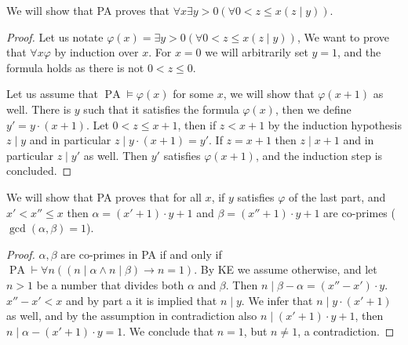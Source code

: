 \question{}
\subquestion{}
We will show that PA proves that $\forall x \exists y > 0 (\forall 0 < z \le x (z \mid y))$.
\begin{proof}
	Let us notate $\varphi(x) = \exists y > 0 (\forall 0 < z \le x (z \mid y))$, We want to prove that $\forall x \varphi$ by induction over $x$.
	For $x = 0$ we will arbitrarily set $y = 1$, and the formula holds as there is not $0 < z \le 0$.

	Let us assume that $\operatorname{PA} \models \varphi(x)$ for some $x$, we will show that $\varphi(x + 1)$ as well.
	There is $y$ such that it satisfies the formula $\varphi(x)$, then we define $y' = y \cdot (x + 1)$.
	Let $0 < z \le x + 1$, then if $z < x + 1$ by the induction hypothesis $z \mid y$ and in particular $z \mid y \cdot (x + 1) = y'$.
	If $z = x + 1$ then $z \mid x + 1$ and in particular $z \mid y'$ as well.
	Then $y'$ satisfies $\varphi(x + 1)$, and the induction step is concluded.
\end{proof}

\subquestion{}
We will show that PA proves that for all $x$, if $y$ satisfies $\varphi$ of the last part,
and $x' < x'' \le x$ then $\alpha = (x' + 1) \cdot y + 1$ and $\beta = (x'' + 1) \cdot y + 1$ are co-primes ($\gcd(\alpha, \beta) = 1$).
\begin{proof}
	$\alpha, \beta$ are co-primes in PA if and only if $\operatorname{PA} \vdash \forall n ((n \mid \alpha \land n \mid \beta) \rightarrow n = 1)$.
	By KE we assume otherwise, and let $n > 1$ be a number that divides both $\alpha$ and $\beta$.
	Then $n \mid \beta - \alpha = (x'' - x') \cdot y$.
	$x'' - x' < x$ and by part a it is implied that $n \mid y$.
	We infer that $n \mid y \cdot (x' + 1)$ as well, and by the assumption in contradiction also $n \mid (x' + 1) \cdot y + 1$, then $n \mid \alpha - (x' + 1) \cdot y = 1$.
	We conclude that $n = 1$, but $n \ne 1$, a contradiction.
\end{proof}

